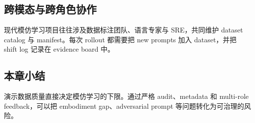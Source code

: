 \subsection{跨模态与跨角色协作}

现代模仿学习项目往往涉及数据标注团队、语言专家与 SRE，共同维护 dataset catalog 与 manifest。每次 rollout 都需要把 new prompts 加入 dataset，并把 shift log 记录在 evidence board 中。

\subsection{本章小结}

演示数据质量直接决定模仿学习的下限。通过严格 audit、metadata 和 multi-role feedback，可以把 embodiment gap、adversarial prompt 等问题转化为可治理的风险。

